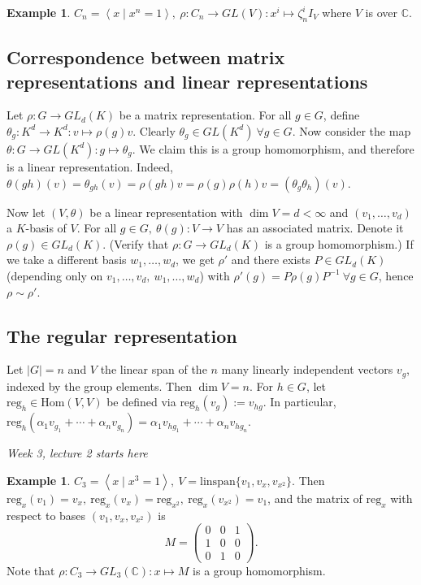 \documentclass{article}
\newcommand{\la}{\left\langle}
\newcommand{\ra}{\right\rangle}
\newcommand{\C}{\mathbb{C}}
\newcommand{\reg}{\text{reg}}
\newcommand{\Hom}{\text{Hom}}
\theoremstyle{definition}
\newtheorem{example}[defn]{Example}
\begin{document}
\begin{example}
$C_n=\la x \mid x^n=1\ra,\ \rho:C_n\rightarrow GL(V):x^i\mapsto\zeta_n^i I_V$ where $V$ is over $\C$.
\end{example}

\subsection{Correspondence between matrix representations and linear representations}
Let $\rho:G\rightarrow GL_d(K)$ be a matrix representation. For all $g\in G$, define $\theta_g:K^d\rightarrow K^d:v\mapsto \rho(g)v$. Clearly $\theta_g\in GL(K^d) \ \forall g\in G$. Now consider the map $\theta:G\rightarrow GL(K^d):g\mapsto\theta_g$. We claim this is a group homomorphism, and therefore is a linear representation. Indeed, $\theta(gh)(v)=\theta_{gh}(v)=\rho(gh)v=\rho(g)\rho(h)v=(\theta_g\theta_h)(v)$.

Now let $(V,\theta)$ be a linear representation with $\dim V=d<\infty$ and $(v_1,\ldots,v_d)$ a $K$-basis of $V$. For all $g\in G,\ \theta(g):V\rightarrow V$ has an associated matrix. Denote it $\rho(g)\in GL_d(K)$. (Verify that $\rho:G\rightarrow GL_d(K)$ is a group homomorphism.) If we take a different basis $w_1,\ldots,w_d$, we get $\rho'$ and there exists $P\in GL_d(K)$ (depending only on $v_1,\ldots,v_d,\ w_1,\ldots,w_d$) with $\rho'(g)=P\rho(g)P^{-1}\ \forall g\in G$, hence $\rho\sim\rho'$.

\subsection{The regular representation}
\label{subsection:regrep}
Let $|G|=n$ and $V$ the linear span of the $n$ many linearly independent vectors $v_g$, indexed by the group elements. Then $\dim V=n$. For $h\in G$, let $\reg_h\in\Hom(V,V)$ be defined via $\reg_h(v_g):=v_{hg}$. In particular, $\reg_h(\alpha_1v_{g_1}+\cdots+\alpha_nv_{g_n})=\alpha_1v_{hg_1}+\cdots+\alpha_nv_{hg_n}.$

\begin{flushright}
\textit{Week 3, lecture 2 starts here}
\end{flushright}

\begin{example}
$C_3=\la x\mid x^3=1\ra,\ V=\text{linspan}\{v_1,v_x,v_{x^2}\}$. Then $\reg_x(v_1)=v_x,\ \reg_x(v_x)=\reg_{x^2},\ \reg_x(v_{x^2})=v_1$, and the matrix of $\reg_x$ with respect to bases $(v_1,v_x,v_{x^2})$ is
\[
M=\begin{pmatrix}0&0&1\\1&0&0\\0&1&0\end{pmatrix}.
\]
Note that $\rho:C_3\rightarrow GL_3(\C):x\mapsto M$ is a group homomorphism.
\end{example}
\end{document}

